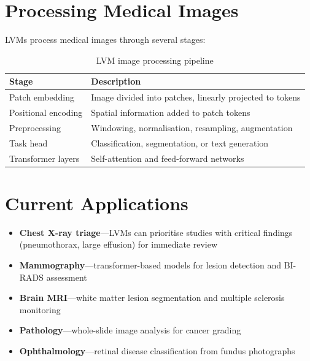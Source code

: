 \section{Processing Medical Images}
LVMs process medical images through several stages:
\begin{table}[h]
\centering
\caption{LVM image processing pipeline}
\begin{tabular}{|p{}|p{}|}
\hline
\textbf{Stage} & \textbf{Description} \\
\hline
Patch embedding & Image divided into patches, linearly projected to tokens \\
\hline
Positional encoding & Spatial information added to patch tokens \\
\hline
Preprocessing & Windowing, normalisation, resampling, augmentation \\
\hline
Task head & Classification, segmentation, or text generation \\
\hline
Transformer layers & Self-attention and feed-forward networks \\
\hline
\end{tabular}
\end{table}

\section{Current Applications}
\begin{itemize}
    \item \textbf{Chest X-ray triage}---LVMs can prioritise studies with critical findings (pneumothorax, large effusion) for immediate review
    \item \textbf{Mammography}---transformer-based models for lesion detection and BI-RADS assessment
    \item \textbf{Brain MRI}---white matter lesion segmentation and multiple sclerosis monitoring
    \item \textbf{Pathology}---whole-slide image analysis for cancer grading
    \item \textbf{Ophthalmology}---retinal disease classification from fundus photographs
\end{itemize}

